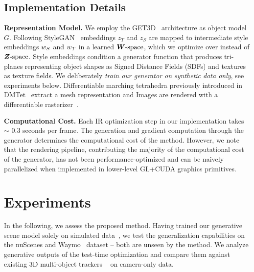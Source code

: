 \subsection{Implementation Details}\label{ssec:optim}
\noindent
\textbf{Representation Model.} 
We employ the GET3D~\cite{gao2022get3d} architecture as object model $G$. Following StyleGAN~\cite{karras2019styleGAN,karras2020styleGAN2} embeddings $z_{T}$ and $z_{S}$ are mapped to intermediate style embeddings $\boldmath{w}_S$ and $\boldmath{w}_T$ in a learned $\boldmath{W}\text{-space}$, which we optimize over instead of $\boldmath{Z}\text{-space}$. Style embeddings condition a generator function that produces tri-planes representing object shapes as Signed Distance Fields (SDFs) and textures as texture fields. We deliberately \emph{train our generator on synthetic data only}, see experiments below. Differentiable marching tetrahedra previously introduced in DMTet~\cite{shen2021dmtet} extract a mesh representation and Images are rendered with a differentiable rasterizer~\cite{laine2020modular}.

\vspace{0.5\baselineskip}
\noindent
\textbf{Computational Cost.}
%
Each IR optimization step in our implementation takes $\sim$ 0.3 seconds per frame. The generation and gradient computation through the generator determines the computational cost of the method. However, we note that the rendering pipeline, contributing the majority of the computational cost of the generator, has not been performance-optimized and can be naively parallelized when implemented in lower-level GL+CUDA graphics primitives.



\section{Experiments}\label{sec:exp}
In the following, we assess the proposed method. Having trained our generative scene model solely on simulated data~\cite{shapenet2015}, we test the generalization capabilities on the nuScenes \cite{caesar2020nuscenes} and Waymo~\cite{sun2020scalability} dataset -- both are unseen by the method. We analyze generative outputs of the test-time optimization and compare them against existing 3D multi-object trackers ~\cite{zhou2020CenterTrack, weng2020AB3DMOT, hu2021QD3DT,wang2023StreamPETR, yang2022qtrack} on camera-only data.

